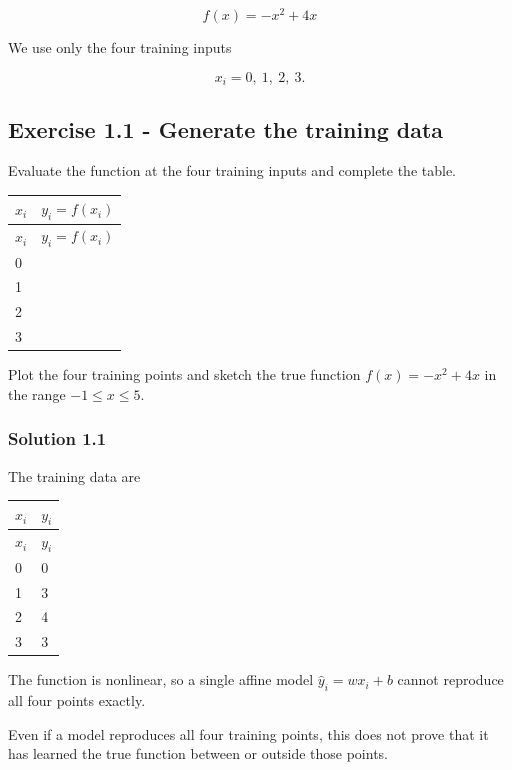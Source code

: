 \documentclass[10pt]{article}
\begin{document}
\[
f(x)=-x^2+4x
\]

We use only the four training inputs

\[
x_i=0,\ 1,\ 2,\ 3.
\]

\subsection*{Exercise 1.1 - Generate the training data}
Evaluate the function at the four training inputs and complete the table.

\begingroup
\small
\setlength{\tabcolsep}{4pt}
\begin{longtable}{l|l}
$x_i$ & $y_i=f(x_i)$ \\[1.5pt]
\hline
\endfirsthead
$x_i$ & $y_i=f(x_i)$ \\[1.5pt]
\hline
\endhead
\rule{0pt}{2.4ex}0 &  $\phantom{-0.00}$ \\[3pt]
\rule{0pt}{2.4ex}1 &  $\phantom{-0.00}$ \\[3pt]
\rule{0pt}{2.4ex}2 &  $\phantom{-0.00}$ \\[3pt]
\rule{0pt}{2.4ex}3 &  $\phantom{-0.00}$ \\[3pt]
\end{longtable}
\endgroup
Plot the four training points and sketch the true function $f(x)=-x^2+4x$ in the range $-1\leq x\leq5$.

\begingroup\color{red}

\subsubsection*{Solution 1.1}
The training data are

\begingroup
\small
\setlength{\tabcolsep}{4pt}
\begin{longtable}{l|l}
$x_i$ & $y_i$ \\[1.5pt]
\hline
\endfirsthead
$x_i$ & $y_i$ \\[1.5pt]
\hline
\endhead
0 & 0 \\[1.5pt]
1 & 3 \\[1.5pt]
2 & 4 \\[1.5pt]
3 & 3 \\[1.5pt]
\end{longtable}
\endgroup
The function is nonlinear, so a single affine model $\hat y_i=wx_i+b$ cannot reproduce all four points exactly.

Even if a model reproduces all four training points, this does not prove that it has learned the true function between or outside those points.
\end{document}

